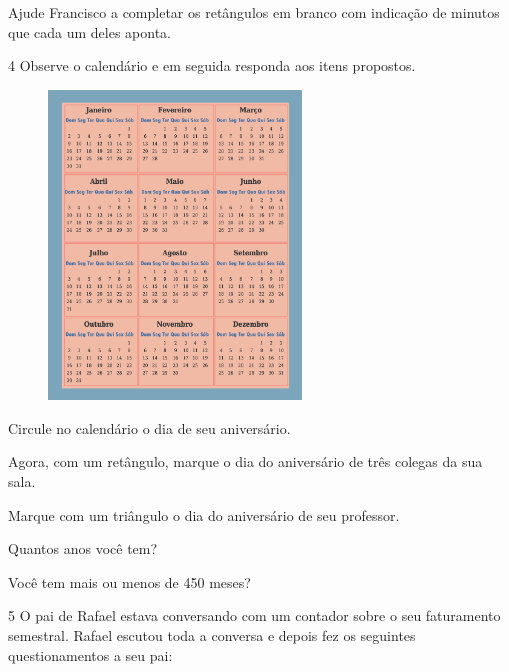 Ajude Francisco a completar os retângulos em branco com indicação de
minutos que cada um deles aponta.


\pagebreak

\num{4} Observe o calendário e em seguida responda aos itens propostos.

\begin{figure}[htpb!]
\centering
\includegraphics[width=0.6\textwidth]{./media/image54.png}
\end{figure}

\begin{escolha}
\item Circule no calendário o dia de seu aniversário.

\item Agora, com um retângulo, marque o dia do aniversário de três colegas da sua sala.

\item Marque com um triângulo o dia do aniversário de seu professor.

\item Quantos anos você tem?

\item Você tem mais ou menos de 450 meses?
\end{escolha}

\num{5} O pai de Rafael estava conversando com um contador sobre o seu
faturamento semestral. Rafael escutou toda a conversa e depois fez os
seguintes questionamentos a seu pai:

